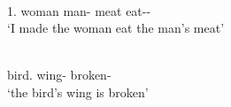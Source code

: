 \begin{exe}\ex\label{WapGen}
\begin{xlist}
\ex\gll{}      \\
1\sg{}.\nom{} \dem{} woman \dem{} man-\gen{} meat eat-\caus{}-\pst{}\\
\glt `I made the woman eat the man's meat' %

\ex\gll\textbf{}  \\
bird.\acc{} wing-\nom{} broken-\stat{}\\
\glt `the bird's wing is broken'%
\end{xlist}
\end{exe}

%




